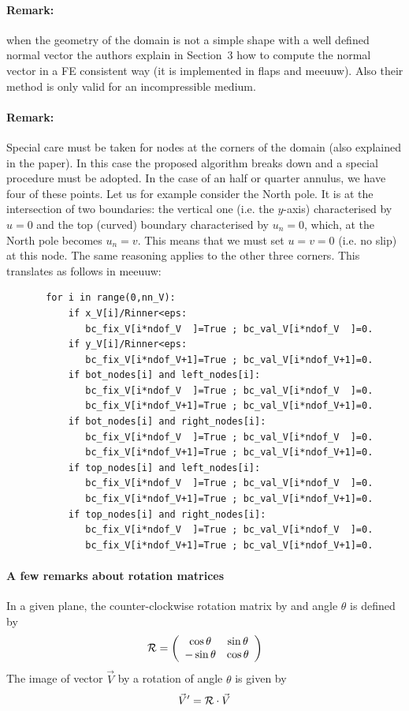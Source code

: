 \paragraph{Remark:} when the geometry of the domain is not a simple shape with a well defined normal vector
the authors explain in Section~3 how to compute the normal vector in a FE consistent way (it is implemented in 
{\sc flaps} and {\sc meeuuw}). Also their method is only valid for an incompressible medium.

\paragraph{Remark:} Special care must be taken for nodes at the corners of the domain (also explained in the
paper). In this case the proposed algorithm breaks down and a special procedure must be adopted.
In the case of an half or quarter annulus, we have four of these points. 
Let us for example consider the North pole. It is at the intersection of two boundaries: 
the vertical one (i.e. the $y$-axis) characterised by $u=0$ and the top (curved) boundary
characterised by $u_n=0$, which, at the North pole becomes $u_n=v$. This means that we must 
set $u=v=0$ (i.e. no slip) at this node. The same reasoning applies to the other three corners.
This translates as follows in {\sc meeuuw}:
\begin{lstlisting}
       for i in range(0,nn_V):
           if x_V[i]/Rinner<eps:
              bc_fix_V[i*ndof_V  ]=True ; bc_val_V[i*ndof_V  ]=0.
           if y_V[i]/Rinner<eps:
              bc_fix_V[i*ndof_V+1]=True ; bc_val_V[i*ndof_V+1]=0.
           if bot_nodes[i] and left_nodes[i]:
              bc_fix_V[i*ndof_V  ]=True ; bc_val_V[i*ndof_V  ]=0.
              bc_fix_V[i*ndof_V+1]=True ; bc_val_V[i*ndof_V+1]=0.
           if bot_nodes[i] and right_nodes[i]:
              bc_fix_V[i*ndof_V  ]=True ; bc_val_V[i*ndof_V  ]=0.
              bc_fix_V[i*ndof_V+1]=True ; bc_val_V[i*ndof_V+1]=0.
           if top_nodes[i] and left_nodes[i]:
              bc_fix_V[i*ndof_V  ]=True ; bc_val_V[i*ndof_V  ]=0.
              bc_fix_V[i*ndof_V+1]=True ; bc_val_V[i*ndof_V+1]=0.
           if top_nodes[i] and right_nodes[i]:
              bc_fix_V[i*ndof_V  ]=True ; bc_val_V[i*ndof_V  ]=0.
              bc_fix_V[i*ndof_V+1]=True ; bc_val_V[i*ndof_V+1]=0.
\end{lstlisting}



\paragraph{A few remarks about rotation matrices} 
In a given plane, the counter-clockwise rotation matrix by and angle $\theta$ is defined by 
\[
{\cal R}=
\left(
\begin{array}{cc}
\cos\theta & \sin\theta \\
-\sin\theta & \cos\theta
\end{array}
\right)
\]
The image of vector $\vec{V}$ by a rotation of angle $\theta$ is given by
\[
\vec{V}'={\cal R}\cdot \vec{V}
\]

